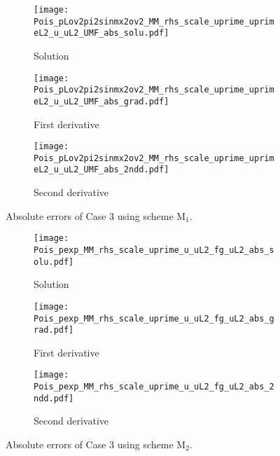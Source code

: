 \documentclass[final,3p]{elsarticle}
\begin{document}
\begin{figure}[!ht]
    \begin{subfigure}{5.5cm}
        \texttt{[image: Pois\_pLov2pi2sinmx2ov2\_MM\_rhs\_scale\_uprime\_uprimeL2\_u\_uL2\_UMF\_abs\_solu.pdf]}
        \caption{Solution}
        \label{Fig:Pois_pLov2pi2sinmx2ov2_MM_rhs_scale_uprime_uprimeL2_u_uL2_UMF_abs_solu}
    \end{subfigure}
    \begin{subfigure}{5.5cm}
        \texttt{[image: Pois\_pLov2pi2sinmx2ov2\_MM\_rhs\_scale\_uprime\_uprimeL2\_u\_uL2\_UMF\_abs\_grad.pdf]}
        \caption{First derivative}
        \label{Fig:Pois_pLov2pi2sinmx2ov2_MM_rhs_scale_uprime_uprimeL2_u_uL2_UMF_abs_grad}
    \end{subfigure}
    \begin{subfigure}{5.5cm}
        \texttt{[image: Pois\_pLov2pi2sinmx2ov2\_MM\_rhs\_scale\_uprime\_uprimeL2\_u\_uL2\_UMF\_abs\_2ndd.pdf]}
        \caption{Second derivative}
        \label{Fig:Pois_pLov2pi2sinmx2ov2_MM_rhs_scale_uprime_uprimeL2_u_uL2_UMF_abs_2ndd}
    \end{subfigure}
\caption{Absolute errors of Case 3 using scheme $\text{M}_1$.}
\label{Pois_pLov2pi2sinmx2ov2_MM_rhs_scale_uprime_uprimeL2_u_uL2_UMF_abs}
\end{figure}

\begin{figure}[!ht]
    \begin{subfigure}{5.5cm}
        \texttt{[image: Pois\_pexp\_MM\_rhs\_scale\_uprime\_u\_uL2\_fg\_uL2\_abs\_solu.pdf]}
        \caption{Solution}
        \label{Fig:Pois_pexp_MM_rhs_scale_uprime_u_uL2_fg_uL2_abs_solu}
    \end{subfigure}
    \begin{subfigure}{5.5cm}
        \texttt{[image: Pois\_pexp\_MM\_rhs\_scale\_uprime\_u\_uL2\_fg\_uL2\_abs\_grad.pdf]}
        \caption{First derivative}
        \label{Fig:Pois_pexp_MM_rhs_scale_uprime_u_uL2_fg_uL2_abs_grad}
    \end{subfigure}
    \begin{subfigure}{5.5cm}
        \texttt{[image: Pois\_pexp\_MM\_rhs\_scale\_uprime\_u\_uL2\_fg\_uL2\_abs\_2ndd.pdf]}
        \caption{Second derivative}
        \label{Fig:Pois_pexp_MM_rhs_scale_uprime_u_uL2_fg_uL2_abs_2ndd}
    \end{subfigure}
\caption{Absolute errors of Case 3 using scheme $\text{M}_2$.}
\label{Pois_pexp_MM_rhs_scale_uprime_u_uL2_fg_uL2_abs}
\end{figure}
\end{document}
